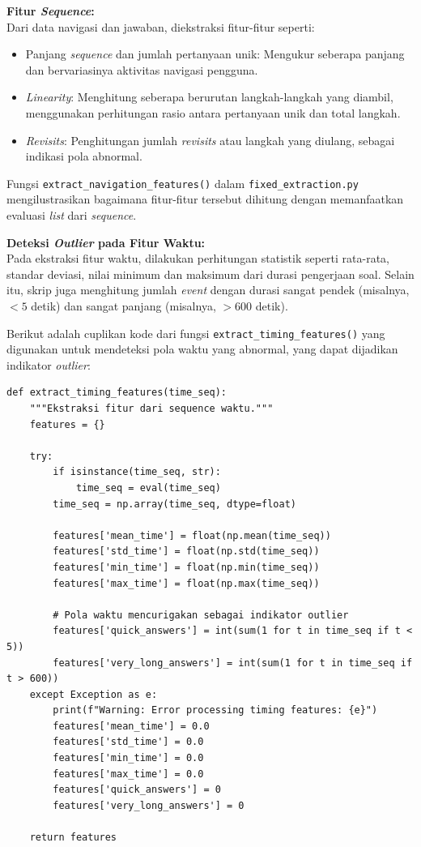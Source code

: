 \textbf{Fitur \textit{Sequence}:} \\
Dari data navigasi dan jawaban, diekstraksi fitur-fitur seperti:
\begin{itemize}
    \item Panjang \textit{sequence} dan jumlah pertanyaan unik: Mengukur seberapa panjang dan bervariasinya aktivitas navigasi pengguna.
    \item \textit{Linearity}: Menghitung seberapa berurutan langkah-langkah yang diambil, menggunakan perhitungan rasio antara pertanyaan unik dan total langkah.
    \item \textit{Revisits}: Penghitungan jumlah \textit{revisits} atau langkah yang diulang, sebagai indikasi pola abnormal.
\end{itemize}
Fungsi \texttt{extract\_navigation\_features()} dalam \texttt{fixed\_extraction.py} mengilustrasikan bagaimana fitur-fitur tersebut dihitung dengan memanfaatkan evaluasi \textit{list} dari \textit{sequence}.

\textbf{Deteksi \textit{Outlier} pada Fitur Waktu:} \\
Pada ekstraksi fitur waktu, dilakukan perhitungan statistik seperti rata-rata, standar deviasi, nilai minimum dan maksimum dari durasi pengerjaan soal. Selain itu, skrip juga menghitung jumlah \textit{event} dengan durasi sangat pendek (misalnya, $< 5$ detik) dan sangat panjang (misalnya, $> 600$ detik).

Berikut adalah cuplikan kode dari fungsi \texttt{extract\_timing\_features()} yang digunakan untuk mendeteksi pola waktu yang abnormal, yang dapat dijadikan indikator \textit{outlier}:

\begin{verbatim}
def extract_timing_features(time_seq):
    """Ekstraksi fitur dari sequence waktu."""
    features = {}
    
    try:
        if isinstance(time_seq, str):
            time_seq = eval(time_seq)
        time_seq = np.array(time_seq, dtype=float)
        
        features['mean_time'] = float(np.mean(time_seq))
        features['std_time'] = float(np.std(time_seq))
        features['min_time'] = float(np.min(time_seq))
        features['max_time'] = float(np.max(time_seq))
        
        # Pola waktu mencurigakan sebagai indikator outlier
        features['quick_answers'] = int(sum(1 for t in time_seq if t < 5))
        features['very_long_answers'] = int(sum(1 for t in time_seq if t > 600))
    except Exception as e:
        print(f"Warning: Error processing timing features: {e}")
        features['mean_time'] = 0.0
        features['std_time'] = 0.0
        features['min_time'] = 0.0
        features['max_time'] = 0.0
        features['quick_answers'] = 0
        features['very_long_answers'] = 0
    
    return features
\end{verbatim}

